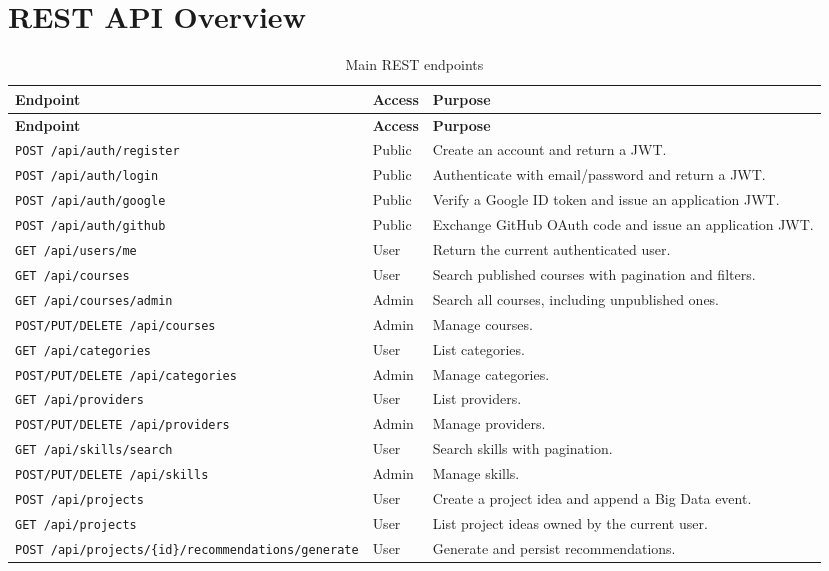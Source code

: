 \documentclass[12pt,a4paper]{report}
\begin{document}
\section{REST API Overview}
\begin{longtable}{p{}p{}p{}}
\caption{Main REST endpoints}\\
\toprule
\textbf{Endpoint} & \textbf{Access} & \textbf{Purpose}\\
\midrule
\endfirsthead
\toprule
\textbf{Endpoint} & \textbf{Access} & \textbf{Purpose}\\
\midrule
\endhead
\texttt{POST /api/auth/register} & Public & Create an account and return a JWT.\\
\texttt{POST /api/auth/login} & Public & Authenticate with email/password and return a JWT.\\
\texttt{POST /api/auth/google} & Public & Verify a Google ID token and issue an application JWT.\\
\texttt{POST /api/auth/github} & Public & Exchange GitHub OAuth code and issue an application JWT.\\
\texttt{GET /api/users/me} & User & Return the current authenticated user.\\
\texttt{GET /api/courses} & User & Search published courses with pagination and filters.\\
\texttt{GET /api/courses/admin} & Admin & Search all courses, including unpublished ones.\\
\texttt{POST/PUT/DELETE /api/courses} & Admin & Manage courses.\\
\texttt{GET /api/categories} & User & List categories.\\
\texttt{POST/PUT/DELETE /api/categories} & Admin & Manage categories.\\
\texttt{GET /api/providers} & User & List providers.\\
\texttt{POST/PUT/DELETE /api/providers} & Admin & Manage providers.\\
\texttt{GET /api/skills/search} & User & Search skills with pagination.\\
\texttt{POST/PUT/DELETE /api/skills} & Admin & Manage skills.\\
\texttt{POST /api/projects} & User & Create a project idea and append a Big Data event.\\
\texttt{GET /api/projects} & User & List project ideas owned by the current user.\\
\texttt{POST /api/projects/\{id\}/recommendations/generate} & User & Generate and persist recommendations.\\

\end{longtable}
\end{document}

